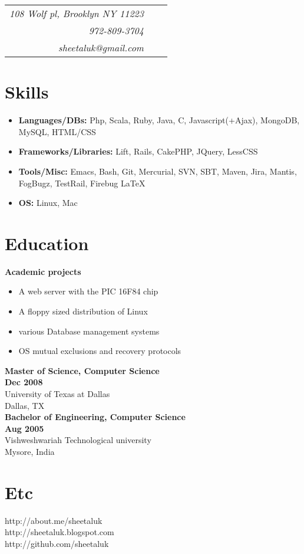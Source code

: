 \documentclass{article}
\begin{document}
\begin{minipage}[t]{3.4in}  
 \begin{tabular}{rrr}
   \vspace{0pt}
   \emph {108 Wolf pl, Brooklyn NY 11223} \\
   \emph {972-809-3704} \\
   \emph {sheetaluk@gmail.com } \\
 \end{tabular}
  \vspace{10pt}
  \section*{Skills}
    \begin{itemize}
      \item {\bf Languages/DBs:} Php, Scala, Ruby, Java, C, Javascript(+Ajax), MongoDB, MySQL, HTML/CSS
      \item {\bf Frameworks/Libraries:} Lift, Rails, CakePHP, JQuery, LessCSS
      \item {\bf Tools/Misc:} Emacs, Bash, Git, Mercurial, SVN, SBT, Maven, Jira, Mantis, FogBugz, TestRail, Firebug \LaTeX
      \item {\bf OS:} Linux, Mac
    \end{itemize}
     
  \section*{Education}
    {\bf Academic projects}
      \begin{itemize}
        \item A web server with the PIC 16F84 chip
        \item A floppy sized distribution of Linux
        \item various Database management systems
        \item OS mutual exclusions and recovery protocols\\
      \end{itemize}
    {\bf Master of Science, Computer Science} \\
    {\bf Dec 2008} \\ 
    University of Texas at Dallas \\
    Dallas, TX \\
        
        
    {\bf Bachelor of Engineering, Computer Science} \\
    {\bf Aug 2005} \\
    Vishweshwariah Technological university \\
    Mysore, India \\
        
    \section*{Etc}
    http://about.me/sheetaluk \\
    http://sheetaluk.blogspot.com \\
    http://github.com/sheetaluk
\end{minipage}
\end{document}
